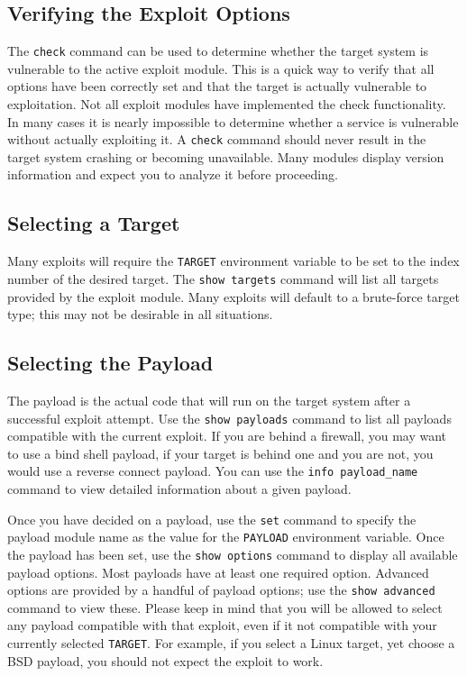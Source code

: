 \documentclass{report}
\begin{document}
		\subsection{Verifying the Exploit Options}

\par	
The \texttt{check} command can be used to determine whether the target system is
vulnerable to the active exploit module. This is a quick way to verify that all
options have been correctly set and that the target is actually vulnerable to
exploitation. Not all exploit modules have implemented the check functionality.
In many cases it is nearly impossible to determine whether a service is
vulnerable without actually exploiting it. A \texttt{check} command should never
result in the target system crashing or becoming unavailable. Many modules
display version information and expect you to analyze it before proceeding.

		\subsection{Selecting a Target}

\par
Many exploits will require the \texttt{TARGET} environment variable to be set to
the index number of the desired target. The \texttt{show targets} command will
list all targets provided by the exploit module. Many exploits will default to a
brute-force target type; this may not be desirable in all situations.

		\subsection{Selecting the Payload}

\par
The payload is the actual code that will run on the target system after a
successful exploit attempt. Use the \texttt{show payloads} command to list all
payloads compatible with the current exploit. If you are behind a firewall, you
may want to use a bind shell payload, if your target is behind one and you are
not, you would use a reverse connect payload. You can use the
\texttt{info payload\_name} command to view detailed information about a given
payload.

\par
Once you have decided on a payload, use the \texttt{set} command to specify the
payload module name as the value for the \texttt{PAYLOAD} environment variable.
Once the payload has been set, use the \texttt{show options} command to display
all available payload options. Most payloads have at least one required option.
Advanced options are provided by a handful of payload options; use the
\texttt{show advanced} command to view these. Please keep in mind that you will
be allowed to select any payload compatible with that exploit, even if it not
compatible with your currently selected \texttt{TARGET}. For example, if you
select a Linux target, yet choose a BSD payload, you should not expect the
exploit to work.
\end{document}
